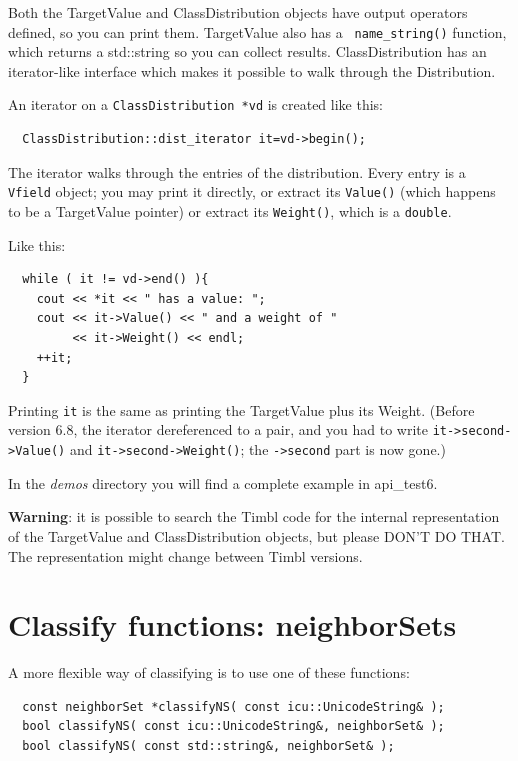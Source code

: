 \documentclass{report}
\begin{document}
Both the TargetValue and ClassDistribution objects have output
operators defined, so you can print them.  TargetValue also has a {\tt
  name\_string()} function, which returns a std::string so you can
collect results.  ClassDistribution has an iterator-like interface
which makes it possible to walk through the Distribution.

An iterator on a {\tt ClassDistribution *vd} is created like this:
\begin{footnotesize}
\begin{verbatim}
  ClassDistribution::dist_iterator it=vd->begin();
\end{verbatim}
\end{footnotesize}

The iterator walks through the entries of the distribution. Every
entry is a {\tt Vfield} object; you may print it directly, or extract
its {\tt Value()} (which happens to be a TargetValue pointer) or
extract its {\tt Weight()}, which is a {\tt double}.

Like this:
\begin{footnotesize}
\begin{verbatim}
  while ( it != vd->end() ){
    cout << *it << " has a value: ";
    cout << it->Value() << " and a weight of "
         << it->Weight() << endl;
    ++it;
  }
\end{verbatim}
\end{footnotesize}

Printing {\tt *it} is the same as printing the
TargetValue plus its Weight. (Before version 6.8, the iterator
dereferenced to a pair, and you had to write {\tt it->second->Value()}
and {\tt it->second->Weight()}; the {\tt ->second} part is now gone.)

In the {\em demos}\/ directory you will find a complete example in api\_test6.

{\bf Warning}: it is possible to search the Timbl code for the
internal representation of the TargetValue and ClassDistribution
objects, but please DON'T DO THAT.  The representation might change
between Timbl versions.

\section{Classify functions: neighborSets}

A more flexible way of classifying is to use one of these functions:

\begin{footnotesize}
\begin{verbatim}
  const neighborSet *classifyNS( const icu::UnicodeString& );
  bool classifyNS( const icu::UnicodeString&, neighborSet& );
  bool classifyNS( const std::string&, neighborSet& );
\end{verbatim}
\end{footnotesize}
\end{document}

